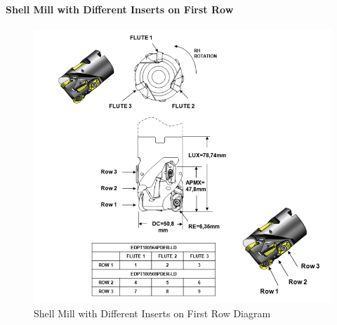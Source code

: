 \pagebreak

\paragraph{Shell Mill with Different Inserts on First Row}\mbox{}
\label{sec:Shell Mill with Different Inserts on First Row}

\begin{figure}[ht]
  \centering
    \includegraphics[width=1.0\textwidth]{figures/Shell Mill with Different Inserts on First Row.png}
  \caption{Shell Mill with Different Inserts on First Row Diagram}
  \label{fig:Shell Mill with Different Inserts on First Row Diagram}
\end{figure}

\FloatBarrier


